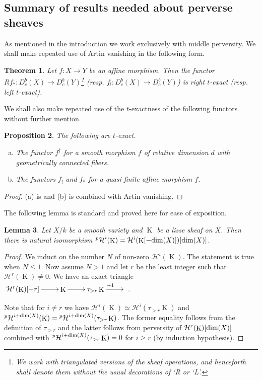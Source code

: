 \documentclass[12pt, reqno]{amsart}
\theoremstyle{plain}
\newtheorem{thm}{\bf Theorem}[subsection]
\newtheorem{lem}[thm]{\bf Lemma}
\newtheorem{prop}[thm]{\bf Proposition}
\theoremstyle{definition}
\theoremstyle{definition}
\newcommand{\ccH}{{\mathcal H}}
\newcommand{\cpH}{{^p\mathcal{H}}}
\DeclareMathOperator{\KK}{K}
\begin{document}
\subsection{Summary of results needed about perverse sheaves}

As mentioned in the introduction we work exclusively with middle perversity. We shall make repeated use of Artin vanishing in the following form. 

\begin{thm}\cite[Theorem 4.1.1]{BBDG18}\label{Artin_Vanishing}
Let $f: X \to Y$ be an affine morphism. Then the functor $Rf_*: D^b_c(X) \to D^b_c(Y)$\footnote{We work with triangulated versions of the sheaf operations, and henceforth shall denote them without the usual decorations of ‘R or ‘L’.} (resp. $f_!: D^b_c(X) \to D^b_c(Y)$)  is right $t$-exact (resp. left $t$-exact).
\end{thm}


We shall also make repeated use of the $t$-exactness of the following functors without further mention.

\begin{prop}\label{t-exact_collection}
The following are $t$-exact.
\begin{enumerate}[(a)]
\item The functor $f^{\dagger}$ for a smooth morphism $f$ of relative dimension $d$ with geometrically connected fibers.

\item The functors $f_!$ and $f_*$ for a quasi-finite affine morphism $f$.

\end{enumerate}

\end{prop}

\begin{proof}
(a) is \cite[Proposition 4.2.5]{BBDG18} and (b) is \cite[Proposition 2.2.5]{BBDG18} combined with Artin vanishing.
\end{proof}

The following lemma is standard and proved here for ease of exposition. 

\begin{lem}\label{perverse_usual}
Let $X/k$ be a smooth variety and $\KK$ be a lisse sheaf on $X$. Then there is natural isomorphism $\cpH^{i}(\KK)=\ccH^{i}(\KK[-\textup{dim}(X)])[\textup{dim}(X)]$.
\end{lem}

\begin{proof}
We induct on the number $N$ of non-zero $\ccH^i(\KK)$. The statement is true when $N \leq 1$. Now assume $N>1$ and let $r$ be the least integer such that $\ccH^r(\KK) \neq 0$. We have an exact triangle $\xymatrix{\ccH^{r}(\KK)[-r] \ar[r] & \KK \ar[r] & \tau_{>r}\KK \ar^{+1}[r]&}$.

 Note that for $i\neq r$ we have $\ccH^i(\KK) \simeq \ccH^{i}(\tau_{>r}\KK)$ and $\cpH^{i+\textup{dim}(X)}(\KK)=\cpH^{i+\textup{dim}(X)}(\tau_{>r}\KK)$. The former equality follows from the definition of $\tau_{>r}$ and the latter follows from perversity of $\ccH^{r}(\KK)[\textup{dim}(X)]$ combined with $\cpH^{i+\textup{dim}(X)}(\tau_{>r}\KK)=0$ for $i \geq r$ (by induction hypothesis).
\end{proof}
\end{document}
